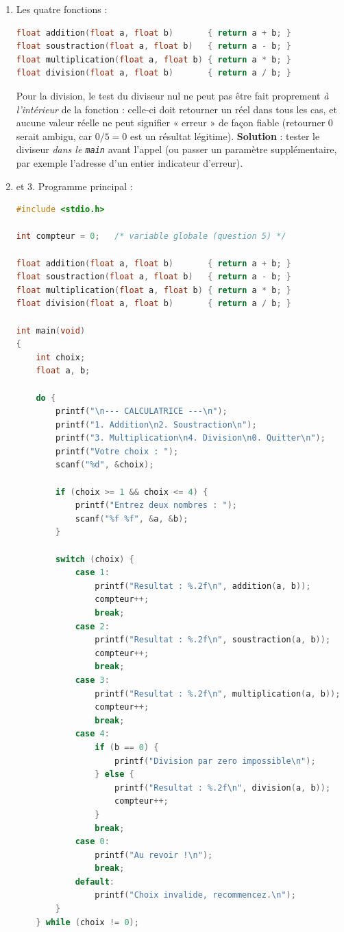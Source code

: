 \documentclass[11pt]{article}
\begin{document}
\begin{corrige}
\begin{enumerate}
\item Les quatre fonctions :
\begin{lstlisting}[language=C]
float addition(float a, float b)       { return a + b; }
float soustraction(float a, float b)   { return a - b; }
float multiplication(float a, float b) { return a * b; }
float division(float a, float b)       { return a / b; }
\end{lstlisting}
Pour la division, le test du diviseur nul ne peut pas être fait proprement \emph{à l'intérieur} de la fonction : celle-ci doit retourner un réel dans tous les cas, et aucune valeur réelle ne peut signifier « erreur » de façon fiable (retourner $0$ serait ambigu, car $0 / 5 = 0$ est un résultat légitime). \textbf{Solution} : tester le diviseur \emph{dans le \texttt{main}} avant l'appel (ou passer un paramètre supplémentaire, par exemple l'adresse d'un entier indicateur d'erreur).
\item et 3. Programme principal :
\begin{lstlisting}[language=C]
#include <stdio.h>

int compteur = 0;   /* variable globale (question 5) */

float addition(float a, float b)       { return a + b; }
float soustraction(float a, float b)   { return a - b; }
float multiplication(float a, float b) { return a * b; }
float division(float a, float b)       { return a / b; }

int main(void)
{
    int choix;
    float a, b;

    do {
        printf("\n--- CALCULATRICE ---\n");
        printf("1. Addition\n2. Soustraction\n");
        printf("3. Multiplication\n4. Division\n0. Quitter\n");
        printf("Votre choix : ");
        scanf("%d", &choix);

        if (choix >= 1 && choix <= 4) {
            printf("Entrez deux nombres : ");
            scanf("%f %f", &a, &b);
        }

        switch (choix) {
            case 1:
                printf("Resultat : %.2f\n", addition(a, b));
                compteur++;
                break;
            case 2:
                printf("Resultat : %.2f\n", soustraction(a, b));
                compteur++;
                break;
            case 3:
                printf("Resultat : %.2f\n", multiplication(a, b));
                compteur++;
                break;
            case 4:
                if (b == 0) {
                    printf("Division par zero impossible\n");
                } else {
                    printf("Resultat : %.2f\n", division(a, b));
                    compteur++;
                }
                break;
            case 0:
                printf("Au revoir !\n");
                break;
            default:
                printf("Choix invalide, recommencez.\n");
        }
    } while (choix != 0);


\end{lstlisting}
\end{enumerate}
\end{corrige}
\end{document}
